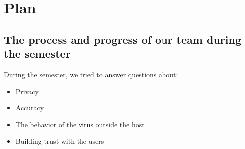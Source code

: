 \section{Plan}
  \subsection{The process and progress of our team during the semester}
    \par During the semester, we tried to answer questions about:
      \begin{itemize}
        \item Privacy
        \item Accuracy
        \item The behavior of the virus outside the host
        \item Building trust with the users
      \end{itemize}
    
